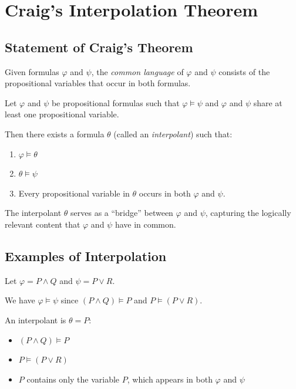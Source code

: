 
\section{Craig's Interpolation Theorem}

\subsection{Statement of Craig's Theorem}

\begin{definition}
Given formulas $\varphi$ and $\psi$, the \emph{common language} of $\varphi$ and
$\psi$ consists of the propositional variables that occur in both formulas.
\end{definition}

\begin{theorem}
Let $\varphi$ and $\psi$ be propositional formulas such that $\varphi \models \psi$
and $\varphi$ and $\psi$ share at least one propositional variable.

Then there exists a formula $\theta$ (called an \emph{interpolant}) such that:
\begin{enumerate}
  \item $\varphi \models \theta$
  \item $\theta \models \psi$
  \item Every propositional variable in $\theta$ occurs in both $\varphi$ and $\psi$.
\end{enumerate}
\end{theorem}

\begin{remark}
The interpolant $\theta$ serves as a ``bridge'' between $\varphi$ and $\psi$,
capturing the logically relevant content that $\varphi$ and $\psi$ have in common.
\end{remark}

\subsection{Examples of Interpolation}

\begin{example}
Let $\varphi = P \wedge Q$ and $\psi = P \vee R$.

We have $\varphi \models \psi$ since $(P \wedge Q) \models P$ and $P \models (P \vee R)$.

An interpolant is $\theta = P$:
\begin{itemize}
  \item $(P \wedge Q) \models P$ \checkmark
  \item $P \models (P \vee R)$ \checkmark
  \item $P$ contains only the variable $P$, which appears in both $\varphi$ and $\psi$ \checkmark
\end{itemize}
\end{example}

